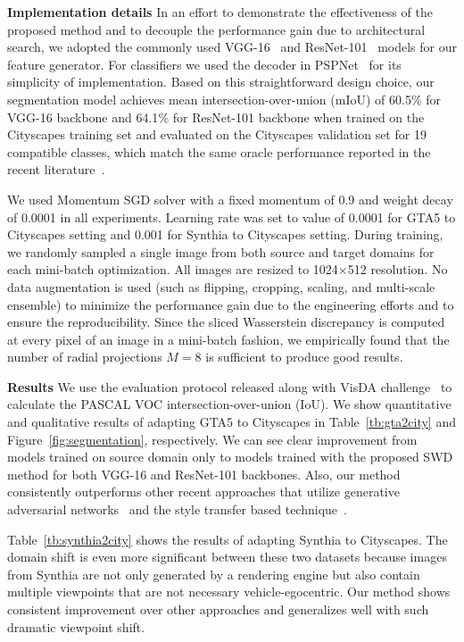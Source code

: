 \documentclass[10pt,twocolumn,letterpaper]{article}
\begin{document}
 

\vspace{2mm}
\noindent \textbf{Implementation details}
In an effort to demonstrate the effectiveness of the proposed method and to decouple the performance gain due to architectural search, we adopted the commonly used VGG-16~\cite{simonyan2014very} and ResNet-101~\cite{he2016deep} models for our feature generator. For classifiers we used the decoder in PSPNet~\cite{zhao2017pyramid} for its simplicity of implementation. Based on this straightforward design choice, our segmentation model achieves mean intersection-over-union (mIoU) of 60.5$\%$ for VGG-16 backbone and 64.1$\%$ for ResNet-101 backbone when trained on the Cityscapes training set and evaluated on the Cityscapes validation set for 19 compatible classes, which match the same oracle performance reported in the recent literature~\cite{tsai2018learning, wu2018dcan}.

We used Momentum SGD solver with a fixed momentum of 0.9 and weight decay of 0.0001 in all experiments. Learning rate was set to value of 0.0001 for GTA5 to Cityscapes setting and 0.001 for Synthia to Cityscapes setting. During training, we randomly sampled a single image from both source and target domains for each mini-batch optimization. All images are resized to 1024$\times$512 resolution. No data augmentation is used (such as flipping, cropping, scaling, and multi-scale ensemble) to minimize the performance gain due to the engineering efforts and to ensure the reproducibility.
Since the sliced Wasserstein discrepancy is computed at every pixel of an image in a mini-batch fashion, we empirically found that the number of radial projections $M=8$ is sufficient to produce good results.

\vspace{2mm}
\noindent \textbf{Results}
We use the evaluation protocol released along with VisDA challenge~\cite{visda2017} to calculate the PASCAL VOC intersection-over-union (IoU). We show quantitative and qualitative results of adapting GTA5 to Cityscapes in Table~\ref{tb:gta2city} and Figure~\ref{fig:segmentation}, respectively. We can see clear improvement from models trained on source domain only to models trained with the proposed SWD method for both VGG-16 and ResNet-101 backbones. Also, our method consistently outperforms other recent approaches that utilize generative adversarial networks~\cite{tsai2018learning, hoffman2017cycada} and the style transfer based technique~\cite{wu2018dcan}.

Table~\ref{tb:synthia2city} shows the results of adapting Synthia to Cityscapes. 
The domain shift is even more significant between these two datasets because images from Synthia are not only generated by a rendering engine but also contain multiple viewpoints that are not necessary vehicle-egocentric. Our method shows consistent improvement over other approaches and generalizes well with such dramatic viewpoint shift.
\end{document}
